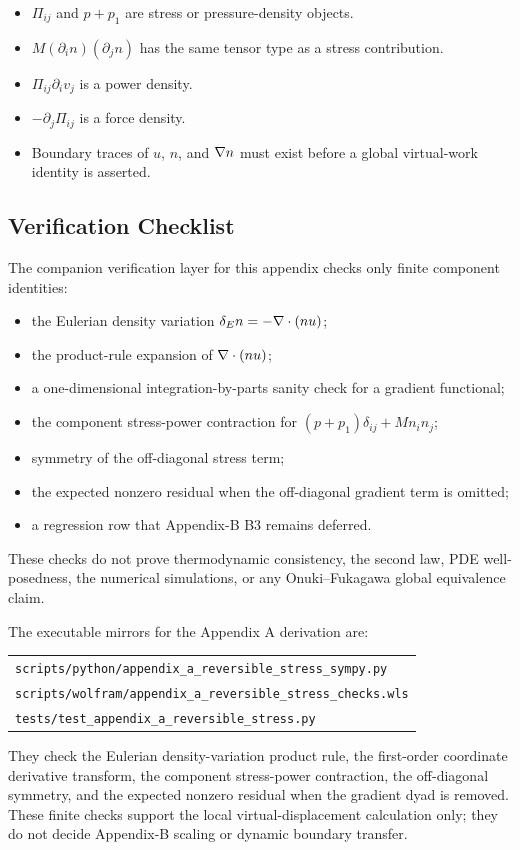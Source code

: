 \begin{itemize}
\item \(\Pi_{ij}\) and \(p+p_1\) are stress or pressure-density objects.
\item \(M(\partial_i n)(\partial_j n)\) has the same tensor type as a stress
  contribution.
\item \(\Pi_{ij}\partial_i v_j\) is a power density.
\item \(-\partial_j\Pi_{ij}\) is a force density.
\item Boundary traces of \(u\), \(n\), and \(\nabla n\) must exist before a
  global virtual-work identity is asserted.
\end{itemize}

\subsection{Verification Checklist}

The companion verification layer for this appendix checks only finite
component identities:

\begin{itemize}
\item the Eulerian density variation
  \(\delta_E n=-\nabla\cdot(nu)\);
\item the product-rule expansion of \(\nabla\cdot(nu)\);
\item a one-dimensional integration-by-parts sanity check for a gradient
  functional;
\item the component stress-power contraction for
  \((p+p_1)\delta_{ij}+M n_i n_j\);
\item symmetry of the off-diagonal stress term;
\item the expected nonzero residual when the off-diagonal gradient term is
  omitted;
\item a regression row that Appendix-B B3 remains deferred.
\end{itemize}

These checks do not prove thermodynamic consistency, the second law, PDE
well-posedness, the numerical simulations, or any Onuki--Fukagawa global
equivalence claim.

The executable mirrors for the Appendix A derivation are:
\begin{center}
\small
\begin{tabular}{@{}l@{}}
\texttt{scripts/python/appendix\_a\_reversible\_stress\_sympy.py}\\
\texttt{scripts/wolfram/appendix\_a\_reversible\_stress\_checks.wls}\\
\texttt{tests/test\_appendix\_a\_reversible\_stress.py}
\end{tabular}
\end{center}
They check the Eulerian density-variation product rule, the first-order
coordinate derivative transform, the component stress-power contraction, the
off-diagonal symmetry, and the expected nonzero residual when the gradient
dyad is removed.  These finite checks support the local virtual-displacement
calculation only; they do not decide Appendix-B scaling or dynamic boundary
transfer.


